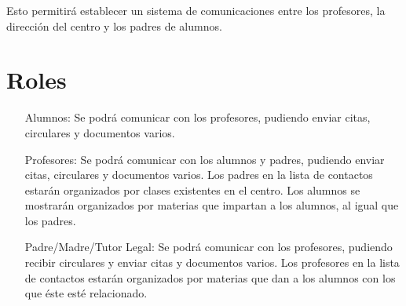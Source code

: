 Esto permitir\'a establecer un sistema de comunicaciones entre los profesores, la direcci\'on del centro y los padres de alumnos.

\section{Roles}

	\begin{itemize}
		\item[Alumnos:] Se podr\'a comunicar con los profesores, pudiendo enviar citas, circulares y documentos varios.
		\item[Profesores:] Se podr\'a comunicar con los alumnos y padres, pudiendo enviar citas, circulares y documentos varios. Los padres en la lista de contactos estar\'an organizados por clases existentes en el centro. Los alumnos se mostrar\'an organizados por materias que impartan a los alumnos, al igual que los padres.
		\item[Padre/Madre/Tutor Legal:] Se podr\'a comunicar con los profesores, pudiendo recibir circulares y enviar citas y documentos varios. Los profesores en la lista de contactos estar\'an organizados por materias que dan a los alumnos con los que \'este est\'e relacionado.
	\end{itemize}
